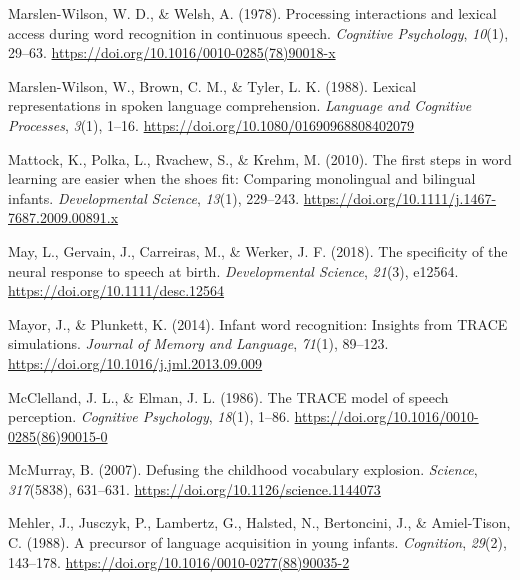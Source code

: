 \documentclass[
  12pt,
  b5paperpaper,
  twoside]{scrreprt}
\newlength{\cslhangindent}
\newlength{\cslentryspacingunit} %
\newenvironment{CSLReferences}[2] %
 {%
  \setlength{\parindent}{0pt}
  \ifodd #1
  \let\oldpar\par
  \def\par{\hangindent=\cslhangindent\oldpar}
  \fi
  \setlength{\parskip}{#2\cslentryspacingunit}
 }%
 {}
\begin{document}
\begin{CSLReferences}{1}{0}
\leavevmode{}%
Marslen-Wilson, W. D., \& Welsh, A. (1978). Processing interactions and
lexical access during word recognition in continuous speech.
\emph{Cognitive Psychology}, \emph{10}(1), 29--63.
\url{https://doi.org/10.1016/0010-0285(78)90018-x}

\leavevmode{}%
Marslen-Wilson, W., Brown, C. M., \& Tyler, L. K. (1988). Lexical
representations in spoken language comprehension. \emph{Language and
Cognitive Processes}, \emph{3}(1), 1--16.
\url{https://doi.org/10.1080/01690968808402079}

\leavevmode{}%
Mattock, K., Polka, L., Rvachew, S., \& Krehm, M. (2010). The first
steps in word learning are easier when the shoes fit: Comparing
monolingual and bilingual infants. \emph{Developmental Science},
\emph{13}(1), 229--243.
\url{https://doi.org/10.1111/j.1467-7687.2009.00891.x}

\leavevmode{}%
May, L., Gervain, J., Carreiras, M., \& Werker, J. F. (2018). The
specificity of the neural response to speech at birth.
\emph{Developmental Science}, \emph{21}(3), e12564.
\url{https://doi.org/10.1111/desc.12564}

\leavevmode{}%
Mayor, J., \& Plunkett, K. (2014). Infant word recognition: Insights
from {TRACE} simulations. \emph{Journal of Memory and Language},
\emph{71}(1), 89--123. \url{https://doi.org/10.1016/j.jml.2013.09.009}

\leavevmode{}%
McClelland, J. L., \& Elman, J. L. (1986). The {TRACE} model of speech
perception. \emph{Cognitive Psychology}, \emph{18}(1), 1--86.
\url{https://doi.org/10.1016/0010-0285(86)90015-0}

\leavevmode{}%
McMurray, B. (2007). Defusing the childhood vocabulary explosion.
\emph{Science}, \emph{317}(5838), 631--631.
\url{https://doi.org/10.1126/science.1144073}

\leavevmode{}%
Mehler, J., Jusczyk, P., Lambertz, G., Halsted, N., Bertoncini, J., \&
Amiel-Tison, C. (1988). A precursor of language acquisition in young
infants. \emph{Cognition}, \emph{29}(2), 143--178.
\url{https://doi.org/10.1016/0010-0277(88)90035-2}


\end{CSLReferences}
\end{document}
